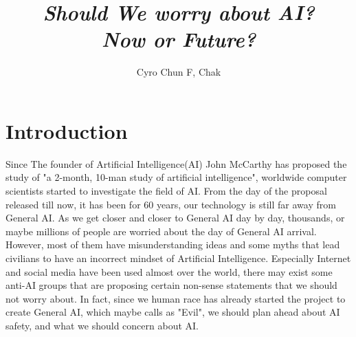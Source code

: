 \documentclass[12pt]{article}
\begin{document}
\title{\emph{Should We worry about AI?}\\
	\emph{Now or Future?}}
\author{Cyro Chun F, Chak}
\maketitle
\section{Introduction}
Since The founder of Artificial Intelligence(AI) John McCarthy has proposed the study of "a 2-month, 10-man study of artificial intelligence", worldwide computer scientists started to investigate the field of AI\cite{MccarthyResearch}. From the day of the proposal released till now, it has been for 60 years, our technology is still far away from General AI. As we get closer and closer to General AI day by day, thousands, or maybe millions of people are worried about the day of General AI arrival. However, most of them have misunderstanding ideas and some myths that lead civilians to have an incorrect mindset of Artificial Intelligence. Especially Internet and social media have been used almost over the world, there may exist some anti-AI groups that are proposing certain non-sense statements that we should not worry about. In fact, since we human race has already started the project to create General AI, which maybe calls as "Evil", we should plan ahead about AI safety, and what we should concern about AI.
\end{document}
